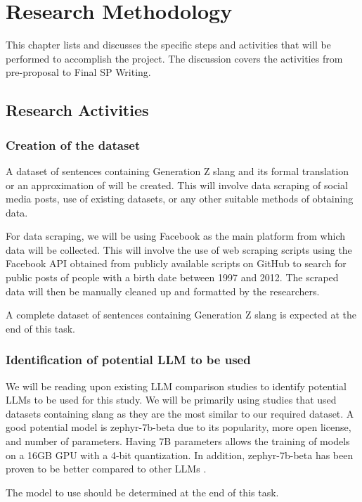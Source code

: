 \chapter{Research Methodology}
This chapter lists and discusses the specific steps and activities that will be performed to accomplish the project. 
The discussion covers the activities from pre-proposal to Final SP Writing.

\section{Research Activities}
\subsection{Creation of the dataset} 
A dataset of sentences containing Generation Z slang and its formal translation or an approximation of will be created. This will involve data scraping of social media posts, use of existing datasets, or any other suitable methods of obtaining data.

For data scraping, we will be using Facebook as the main platform from which data will be collected.
This will involve the use of web scraping scripts using the Facebook API obtained from publicly available scripts on GitHub to search for public posts of people with a birth date between 1997 and 2012. 
The scraped data will then be manually cleaned up and formatted by the researchers.

A complete dataset of sentences containing Generation Z slang is expected at the end of this task. 

\subsection{Identification of potential LLM to be used}
We will be reading upon existing LLM comparison studies to identify potential LLMs to be used for this study.
We will be primarily using studies that used datasets containing slang as they are the most similar to our required dataset.
A good potential model is zephyr-7b-beta due to its popularity, more open license, and number of parameters.
Having 7B parameters allows the training of models on a 16GB GPU with a 4-bit quantization.
In addition, zephyr-7b-beta has been proven to be better compared to other LLMs \cite{Zhu_2023} \cite{zhao2024loraland310finetuned}.

The model to use should be determined at the end of this task.

